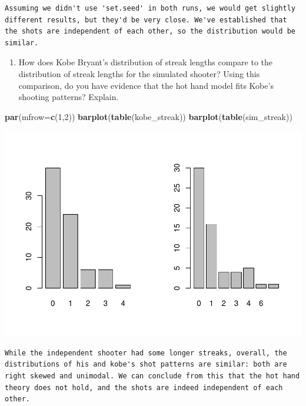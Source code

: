 \documentclass[]{article}
\newenvironment{Shaded}{\begin{snugshade}}{\end{snugshade}}
\newcommand{\KeywordTok}[1]{\textcolor[rgb]{0.13,0.29,0.53}{\textbf{{#1}}}}
\newcommand{\DataTypeTok}[1]{\textcolor[rgb]{0.13,0.29,0.53}{{#1}}}
\newcommand{\DecValTok}[1]{\textcolor[rgb]{0.00,0.00,0.81}{{#1}}}
\newcommand{\NormalTok}[1]{{#1}}
\providecommand{\tightlist}{%
  \setlength{\itemsep}{0pt}\setlength{\parskip}{0pt}}
\begin{document}
\begin{verbatim}
Assuming we didn't use 'set.seed' in both runs, we would get slightly different results, but they'd be very close. We've established that the shots are independent of each other, so the distribution would be similar.
\end{verbatim}

\begin{enumerate}
\def\labelenumi{\arabic{enumi}.}
\setcounter{enumi}{2}
\tightlist
\item
  How does Kobe Bryant's distribution of streak lengths compare to the
  distribution of streak lengths for the simulated shooter? Using this
  comparison, do you have evidence that the hot hand model fits Kobe's
  shooting patterns? Explain.
\end{enumerate}

\begin{Shaded}
\begin{Highlighting}[]
\KeywordTok{par}\NormalTok{(}\DataTypeTok{mfrow=}\KeywordTok{c}\NormalTok{(}\DecValTok{1}\NormalTok{,}\DecValTok{2}\NormalTok{))}
\KeywordTok{barplot}\NormalTok{(}\KeywordTok{table}\NormalTok{(kobe_streak))}
\KeywordTok{barplot}\NormalTok{(}\KeywordTok{table}\NormalTok{(sim_streak))}
\end{Highlighting}
\end{Shaded}

\includegraphics{Lab2_files/figure-latex/unnamed-chunk-5-1.pdf}

\begin{verbatim}
While the independent shooter had some longer streaks, overall, the distributions of his and kobe's shot patterns are similar: both are right skewed and unimodal. We can conclude from this that the hot hand theory does not hold, and the shots are indeed independent of each other.
\end{verbatim}
\end{document}
